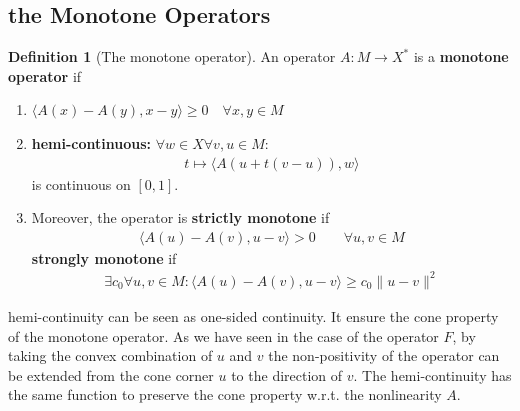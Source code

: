 \documentclass[a4paper,11pt,oneside,fleqn]{book}
\theoremstyle{definition}
\newtheorem{definition}{Definition}[section]
\theoremstyle{remark}
\begin{document}
\subsection{the Monotone Operators}
\begin{definition}[The monotone operator]
	An operator $A: M \rightarrow X^*$ is a \textbf{monotone operator} if 
	\begin{enumerate}
		\item $\langle A(x) - A(y), x - y \rangle \ge 0 \quad \forall x, y \in M$
		\item \textbf{hemi-continuous:} $\forall w \in X \forall v, u \in M$:
		\begin{align*}
			t \mapsto \langle A(u + t(v - u)), w \rangle 
		\end{align*}
		is continuous on $[0, 1]$.
		\item 
	Moreover, the operator is \textbf{strictly monotone} if 
	\begin{align*}
		\langle A(u) - A(v), u - v \rangle > 0 \qquad \forall u, v \in M
	\end{align*}
	\textbf{strongly monotone} if 
	\begin{align*}
		\exists c_0 \forall u, v \in M : \langle A(u) - A(v), u - v \rangle \ge c_0 \|u - v \|^2 
	\end{align*}
	\end{enumerate}
\end{definition}
hemi-continuity can be seen as one-sided continuity. It ensure the cone property of the monotone operator. As we have seen in the case of the operator $F$, by taking the convex combination of $u$ and $v$ the non-positivity of the operator can be extended from the cone corner $u$ to the direction of $v$. The hemi-continuity has the same function to preserve the cone property w.r.t. the nonlinearity $A$. 
\end{document}
